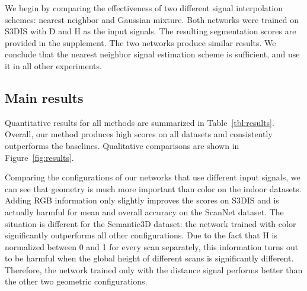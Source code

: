 \documentclass[10pt,twocolumn,letterpaper]{article}
\newcommand{\ra}[1]{\renewcommand{\arraystretch}{#1}}
\begin{document}
We begin by comparing the effectiveness of two different signal interpolation schemes: nearest neighbor and Gaussian mixture.
Both networks were trained on S3DIS with D and H as the input signals.
The resulting segmentation scores are provided in the supplement.
The two networks produce similar results.
We conclude that the nearest neighbor signal estimation scheme is sufficient, and use it in all other experiments.


\begin{comment}
		\begin{table}[h]
		\small
		\centering
			\setlength{\tabcolsep}{5mm}
			\ra{0.9}
			\begin{tabular}{@{}l c c c@{}}
			\toprule
			 Signal & mIoU & mA & oA\\
			\midrule
			 NN & 0.485 & 0.609 & 0.799\\
			 Gaussian & 0.489 & 0.596 & 0.805\\
			\bottomrule
			\end{tabular}
		\vspace{1mm}
		\caption{Signal estimation using nearest neighbors and Gaussian mixtures produce similar results.}
		\label{tbl:sig_int}
		\vspace{-2mm}
		\end{table}
\end{comment}


\subsection{Main results}

Quantitative results for all methods are summarized in Table~\ref{tbl:results}.
Overall, our method produces high scores on all datasets and consistently outperforms the baselines.
Qualitative comparisons are shown in Figure~\ref{fig:results}.

Comparing the configurations of our networks that use different input signals, we can see that geometry is much more important than color on the indoor datasets.
Adding RGB information only slightly improves the scores on S3DIS and is actually harmful for mean and overall accuracy on the ScanNet dataset.
The situation is different for the Semantic3D dataset: the network trained with color significantly outperforms all other configurations.
Due to the fact that H is normalized between 0 and 1 for every scan separately, this information turns out to be harmful when the global height of different scans is significantly different.
Therefore, the network trained only with the distance signal performs better than the other two geometric configurations.
\end{document}
